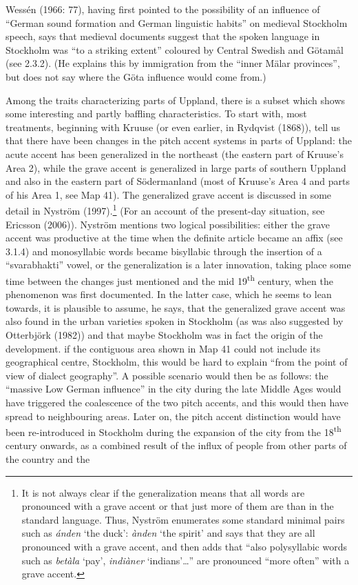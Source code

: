 Wessén (1966: 77), having first pointed to the possibility of an influence of “German sound formation and German linguistic habits” on medieval Stockholm speech, says that medieval documents suggest that the spoken language in Stockholm was “to a striking extent” coloured by Central Swedish and Götamål (see 2.3.2). (He explains this by immigration from the “inner Mälar provinces”, but does not say where the Göta influence would come from.)

Among the traits characterizing parts of Uppland, there is a subset which shows some interesting and partly baffling characteristics. To start with, most treatments, beginning with Kruuse (or even earlier, in Rydqvist (1868)), tell us that there have been changes in the pitch accent systems in parts of Uppland: the acute accent has been generalized in the northeast (the eastern part of Kruuse’s Area 2), while the grave accent is generalized in large parts of southern Uppland and also in the eastern part of Södermanland (most of Kruuse’s Area 4 and parts of his Area 1, see Map 41). The generalized grave accent is discussed in some detail in Nyström (1997).\footnote{ It is not always clear if the generalization means that all words are pronounced with a grave accent or that just more of them are than in the standard language. Thus, Nyström enumerates some standard minimal pairs such as \textit{ánden} ‘the duck’: \textit{ànden} ‘the spirit’ and says that they are all pronounced with a grave accent, and then adds that “also polysyllabic words such as \textit{betàla} ‘pay’, \textit{indiàner} ‘indians’…” are pronounced “more often” with a grave accent. } (For an account of the present-day situation, see Ericsson (2006)). Nyström mentions two logical possibilities: either the grave accent was productive at the time when the definite article became an affix (see 3.1.4) and monosyllabic words became bisyllabic through the insertion of a “svarabhakti” vowel, or the generalization is a later innovation, taking place some time between the changes just mentioned and the mid 19\textsuperscript{th} century, when the phenomenon was first documented. In the latter case, which he seems to lean towards, it is plausible to assume, he says, that the generalized grave accent was also found in the urban varieties spoken in Stockholm (as was also suggested by Otterbjörk (1982)) and that maybe Stockholm was in fact the origin of the development. if the contiguous area shown in Map 41 could not include its geographical centre, Stockholm, this would be hard to explain “from the point of view of dialect geography”. A possible scenario would then be as follows: the “massive Low German influence” in the city during the late Middle Ages would have triggered the coalescence of the two pitch accents, and this would then have spread to neighbouring areas. Later on, the pitch accent distinction would have been re-introduced in Stockholm during the expansion of the city from the 18\textsuperscript{th} century onwards, as a combined result of the influx of people from other parts of the country and the 